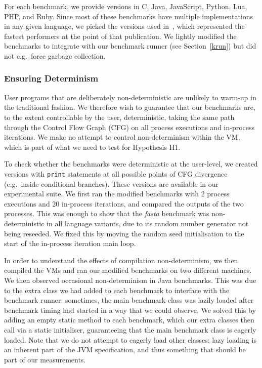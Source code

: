 \documentclass[acmsmall]{acmart}\settopmatter{printfolios=true}
\newcommand{\hypone}{H1\xspace}
\newcommand{\fasta}{\emph{fasta}\xspace}
\begin{document}
For each benchmark, we provide versions in C, Java, JavaScript, Python, Lua, PHP,
and Ruby. Since most of these
benchmarks have multiple implementations in any given language, we picked
the versions used in~\cite{bolz14impact}, which represented the fastest
performers at the point of that publication. We lightly modified
the benchmarks to integrate with our benchmark runner (see Section~\ref{krun})
but did not e.g.~force garbage collection.


\subsubsection{Ensuring Determinism}

User programs that are deliberately non-deterministic are unlikely to
warm-up in the traditional fashion.
We therefore wish to guarantee that our benchmarks are,
to the extent controllable by the user, deterministic, taking
the same path through the Control Flow Graph (CFG)
on all process executions and in-process iterations. We make no attempt to
control non-determinism within the VM, which is part of what we need to test for
Hypothesis \hypone.

To check whether the benchmarks were deterministic at the user-level, we created
versions with \texttt{print} statements at all possible points of CFG
divergence (e.g.~inside conditional branches).
These versions are available in our experimental suite. We first ran the modified
benchmarks with 2 process executions and 20 in-process iterations,
and compared the outputs of the two processes. This was enough to show that the
\fasta benchmark was non-deterministic
in all language variants, due to its random number generator not being reseeded. We
fixed this by moving the random seed initialisation to the start
of the in-process iteration main loop.

In order to understand the effects of compilation non-determinism,
we then compiled the VMs and ran our modified benchmarks on two different machines.
We then observed occasional non-determinism in Java benchmarks.
This was due to the extra class we had added to each benchmark
to interface with the benchmark runner: sometimes, the
main benchmark class was lazily loaded after benchmark timing had started in a
way that we could observe. We
solved this by adding an empty static method to each benchmark, which our
extra classes then call via a static initialiser, guaranteeing that
the main benchmark class is eagerly loaded. Note that we do not attempt to eagerly
load other classes: lazy loading is an inherent part of the JVM specification,
and thus something that should be part of our measurements.
\end{document}
